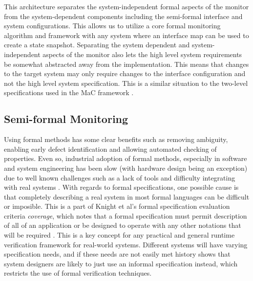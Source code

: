 This architecture separates the system-independent formal aspects of the monitor from the system-dependent components including the semi-formal interface and system configurations. 
This allows us to utilize a core formal monitoring algorithm and framework with any system where an interface map can be used to create a state snapshot. 
Separating the system dependent and system-independent aspects of the monitor also lets the high level system requirements be somewhat abstracted away from the implementation. This means that changes to the target system may only require changes to the interface configuration and not the high level system specification. This is a similar situation to the two-level specifications used in the MaC framework \cite{Kim2004}.

\subsection{Semi-formal Monitoring}
Using formal methods has some clear benefits such as removing ambiguity, enabling early defect identification and allowing automated checking of properties. Even so, industrial adoption of formal methods, especially in software and system engineering has been slow (with hardware design being an exception) due to well known challenges such as a lack of tools and difficulty integrating with real systems \cite{Knight1998}. 
%
With regards to formal specifications, one possible cause is that completely describing a real system in most formal languages can be difficult or imposible. This is a part of Knight et al's formal specification evaluation criteria \emph{coverage}, which notes that a formal specification must permit description of all of an application or be designed to operate with any other notations that will be required \cite{Knight1997a}. 
This is a key concept for any practical and general runtime verification framework for real-world systems. Different systems will have varying specification needs, and if these needs are not easily met history shows that system designers are likely to just use an informal specification instead, which restricts the use of formal verification techniques.

